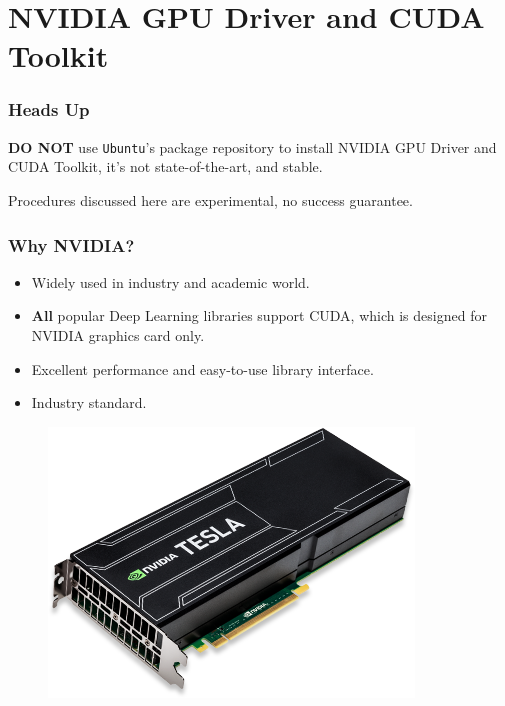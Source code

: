 \documentclass{beamer}
\newcommand{\ubuntu}{\texttt{Ubuntu}\xspace}
\begin{document}
\section{NVIDIA GPU Driver and CUDA Toolkit}

\begin{frame}
\frametitle{Heads Up}

\begin{center}
\textbf{DO NOT} use \ubuntu's package repository to install NVIDIA GPU Driver and CUDA Toolkit, it's not state-of-the-art, and stable.

Procedures discussed here are experimental, no success guarantee.
\end{center}
\end{frame}

\begin{frame}
\frametitle{Why NVIDIA?}

\begin{minipage}{0.6\textwidth}
\begin{itemize}
\item[\checkmark] Widely used in industry and academic world.
\item[\checkmark] \textbf{All} popular Deep Learning libraries support CUDA, which is designed for NVIDIA graphics card only.
\item[\checkmark] Excellent performance and easy-to-use library interface.
\item[\checkmark] Industry standard.
\end{itemize}
\end{minipage}
\begin{minipage}{0.3\textwidth}
\begin{figure}
\includegraphics[width=\textwidth]{nvidia_tesla.png}
\end{figure}
\end{minipage}

\end{frame}
\end{document}
